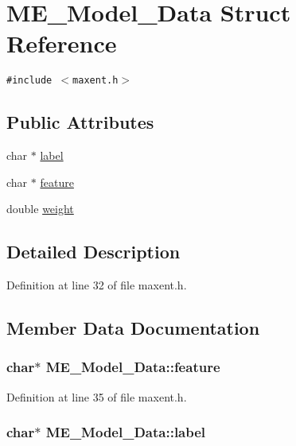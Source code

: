 \hypertarget{structME__Model__Data}{
\section{ME\_\-Model\_\-Data Struct Reference}
\label{structME__Model__Data}
}
{\tt \#include $<$maxent.h$>$}

\subsection*{Public Attributes}
\begin{CompactItemize}
\item 
char $\ast$ \hyperlink{structME__Model__Data_28af5762576a040558408e6fb66e73d7}{label}
\item 
char $\ast$ \hyperlink{structME__Model__Data_06a4ae7a5d89eb0f8fd8eb9c02fbdad0}{feature}
\item 
double \hyperlink{structME__Model__Data_d93cb18e1b315dfaca1613886a789781}{weight}
\end{CompactItemize}


\subsection{Detailed Description}


Definition at line 32 of file maxent.h.

\subsection{Member Data Documentation}
\hypertarget{structME__Model__Data_06a4ae7a5d89eb0f8fd8eb9c02fbdad0}{
\subsubsection[{feature}]{\setlength{\rightskip}{0pt plus 5cm}char$\ast$ {\bf ME\_\-Model\_\-Data::feature}}}
\label{structME__Model__Data_06a4ae7a5d89eb0f8fd8eb9c02fbdad0}




Definition at line 35 of file maxent.h.\hypertarget{structME__Model__Data_28af5762576a040558408e6fb66e73d7}{
\subsubsection[{label}]{\setlength{\rightskip}{0pt plus 5cm}char$\ast$ {\bf ME\_\-Model\_\-Data::label}}}
\label{structME__Model__Data_28af5762576a040558408e6fb66e73d7}




